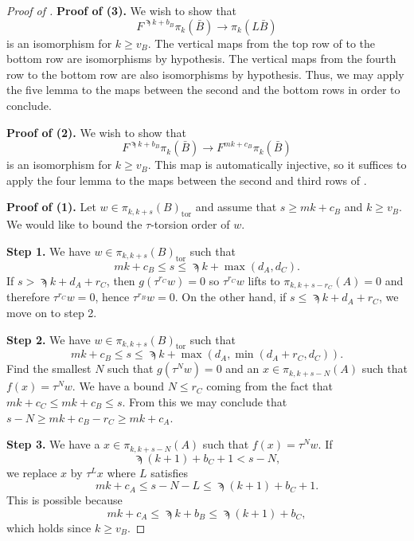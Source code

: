 \begin{proof}[Proof of ]
  {\bf Proof of (3).} %
  We wish to show that
  $$ F^{\sampi k + b_B} \pi_{k} (\bar{B}) \to \pi_k (L \bar{B}) $$
  is an isomorphism for $k \geq v_B$.
  The vertical maps from the top row of  to the bottom row are isomorphisms by hypothesis. The vertical maps from the fourth row to the bottom row are also isomorphisms by hypothesis.
  Thus, we may apply the five lemma to the maps between the second and the bottom rows in order to conclude.

  {\bf Proof of (2).} %
  We wish to show that
  $$ F^{\sampi k + b_B} \pi_{k} (\bar{B}) \to F^{mk + c_B} \pi_k (\bar{B}) $$
  is an isomorphism for $k \geq v_B$.
  This map is automatically injective, so it suffices to apply the four lemma to the maps between the second and third rows of .

  {\bf Proof of (1).} %
  Let $w \in \pi_{k,k+s} (B)_{\mathrm{tor}}$ and assume that $s \geq m k + c_B$ and $k \geq v_B$.
  We would like to bound the $\tau$-torsion order of $w$. 

  {\bf Step 1.} We have $ w \in \pi_{k,k+s}(B)_{\mathrm{tor}}$ such that
  $$ mk + c_B \leq s \leq \sampi k + \max(d_A, d_C). $$
  If $s > \sampi k + d_A +r_C$, then $g(\tau^{r_C}w) = 0$ so $\tau^{r_C} w$ lifts to $\pi_{k,k+s-r_C}(A) = 0$ and therefore $\tau^{r_C}w = 0$, hence $\tau^{r_B} w =0$.
  On the other hand, if $s \leq \sampi k + d_A + r_C$, we move on to step 2.

  {\bf Step 2.} We have $ w \in \pi_{k,k+s}(B)_{\mathrm{tor}}$ such that
  $$ mk + c_B \leq s \leq \sampi k + \max(d_A, \min(d_A + r_C, d_C)). $$
  Find the smallest $N$ such that $g(\tau^Nw) = 0$ and an $x \in \pi_{k,k+s-N}(A)$ such that $f(x)= \tau^N w$. We have a bound $N \leq r_C$ coming from the fact that
  $ mk + c_C \leq mk + c_B \leq s. $
  From this we may conclude that $s-N \geq mk + c_B - r_C \geq mk + c_A$.
  
  {\bf Step 3.} We have a $x \in \pi_{k,k+s-N}(A)$ such that $f(x) = \tau^Nw$.
  If $$ \sampi (k+1) + b_C + 1 < s-N, $$ we replace $x$ by $\tau^L x$ where $L$ satisfies
  \[ mk + c_A \leq s-N-L \leq \sampi (k+1) + b_C + 1. \]
  This is possible because \[mk + c_A \leq \sampi k + b_B \leq \sampi (k+1) + b_C,\] which holds since $k \geq v_B$.
  

\end{proof}
